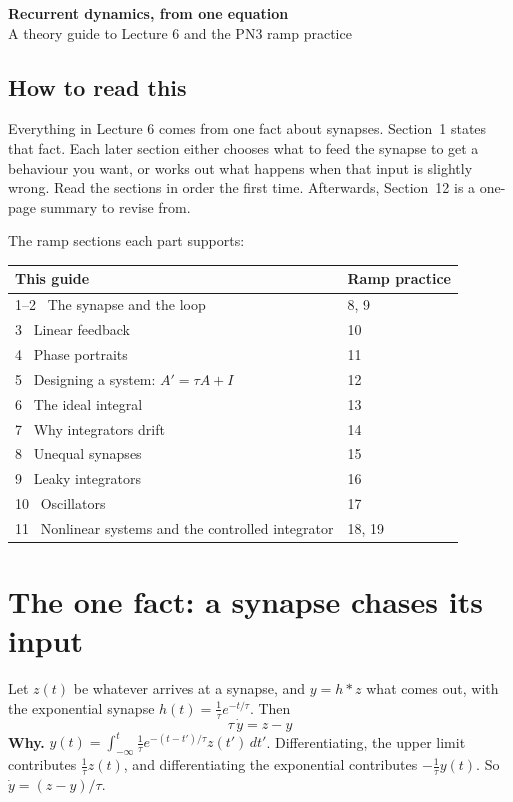 \documentclass[11pt,letterpaper]{article}
\begin{document}
\begin{center}
{\LARGE\bfseries Recurrent dynamics, from one equation}\\[4pt]
{\large A theory guide to Lecture 6 and the PN3 ramp practice}
\end{center}

\subsection*{How to read this}

Everything in Lecture 6 comes from one fact about synapses. Section~1 states that fact. Each later section either chooses what to feed the synapse to get a behaviour you want, or works out what happens when that input is slightly wrong. Read the sections in order the first time. Afterwards, Section~12 is a one-page summary to revise from.

The ramp sections each part supports:

\begin{center}
\begin{tabular}{@{}ll@{}}
\toprule
This guide & Ramp practice \\
\midrule
1--2 \ The synapse and the loop & 8, 9 \\
3 \ Linear feedback & 10 \\
4 \ Phase portraits & 11 \\
5 \ Designing a system: $A' = \tau A + I$ & 12 \\
6 \ The ideal integral & 13 \\
7 \ Why integrators drift & 14 \\
8 \ Unequal synapses & 15 \\
9 \ Leaky integrators & 16 \\
10 \ Oscillators & 17 \\
11 \ Nonlinear systems and the controlled integrator & 18, 19 \\
\bottomrule
\end{tabular}
\end{center}

\section{The one fact: a synapse chases its input}

Let $z(t)$ be whatever arrives at a synapse, and $y = h * z$ what comes out, with the exponential synapse $h(t) = \frac{1}{\tau}e^{-t/\tau}$. Then
\[
\boxed{\ \tau\,\dot y = z - y\ }
\]
\textbf{Why.} $y(t) = \int_{-\infty}^{t}\frac1\tau e^{-(t - t')/\tau}z(t')\,dt'$. Differentiating, the upper limit contributes $\frac1\tau z(t)$, and differentiating the exponential contributes $-\frac1\tau y(t)$. So $\dot y = (z - y)/\tau$.
\end{document}
